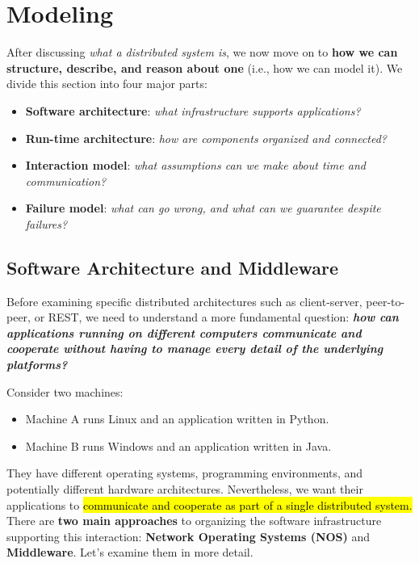 \section{Modeling}\label{sec:modeling}

After discussing \emph{what a distributed system is}, we now move on to \textbf{how we can structure, describe, and reason about one} (i.e., how we can model it). We divide this section into four major parts:
\begin{itemize}
    \item \textbf{Software architecture}: \emph{what infrastructure supports applications?}
    \item \textbf{Run-time architecture}: \emph{how are components organized and connected?}
    \item \textbf{Interaction model}: \emph{what assumptions can we make about time and communication?}
    \item \textbf{Failure model}: \emph{what can go wrong, and what can we guarantee despite failures?}
\end{itemize}

\newpage

\subsection{Software Architecture and Middleware}\label{sec:modeling--software-architecture-and-middleware}

Before examining specific distributed architectures such as client-server, peer-to-peer, or REST, we need to understand a more fundamental question: \emph{\textbf{how can applications running on different computers communicate and cooperate without having to manage every detail of the underlying platforms?}}

\highspace
Consider two machines:
\begin{itemize}
    \item Machine A runs Linux and an application written in Python.
    \item Machine B runs Windows and an application written in Java.
\end{itemize}
They have different operating systems, programming environments, and potentially different hardware architectures.
Nevertheless, we want their applications to \hl{communicate and cooperate as part of a single distributed system.}
There are \textbf{two main approaches} to organizing the software infrastructure supporting this interaction: \textbf{Network Operating Systems (NOS)} and \textbf{Middleware}. Let's examine them in more detail.


